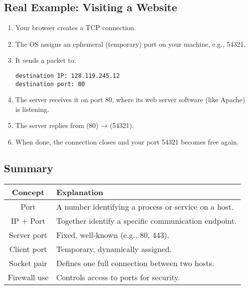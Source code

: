 \documentclass[12pt]{article}
\begin{document}
\subsection{Real Example: Visiting a Website}
\begin{enumerate}
    \item Your browser creates a TCP connection.
    \item The OS assigns an ephemeral (temporary) port on your machine, e.g., 54321.
    \item It sends a packet to:
          \begin{verbatim}
destination IP: 128.119.245.12
destination port: 80
          \end{verbatim}
    \item The server receives it on port 80, where its web server software (like Apache) is listening.
    \item The server replies from (80) → (54321).
    \item When done, the connection closes and your port 54321 becomes free again.
\end{enumerate}

\subsection{Summary}
\begin{center}
    \begin{tabular}{|c|p{8cm}|}
        \hline
        \textbf{Concept} & \textbf{Explanation}                                 \\
        \hline
        Port             & A number identifying a process or service on a host. \\
        IP + Port        & Together identify a specific communication endpoint. \\
        Server port      & Fixed, well-known (e.g., 80, 443).                   \\
        Client port      & Temporary, dynamically assigned.                     \\
        Socket pair      & Defines one full connection between two hosts.       \\
        Firewall use     & Controls access to ports for security.               \\
        \hline
    \end{tabular}
\end{center}
\end{document}
